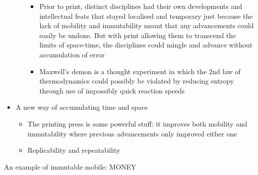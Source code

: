 \documentclass[a4paper]{article}
\begin{document}
\begin{itemize}
\begin{itemize}[label=$\circ$]
\begin{itemize}[label=\textsection]
			\item Prior to print, distinct disciplines had their own developments and intellectual feats that stayed localised and temporary just because the lack of mobility and immutability meant that any advancements could easily be undone. But with print allowing them to transcend the limits of space-time, the disciplines could mingle and advance without accumulation of error
			\item Maxwell’s demon is a thought experiment in which the 2nd law of thermodynamics could possibly be violated by reducing entropy through use of impossibly quick reaction speeds
		\end{itemize}
	\end{itemize}
	\item A new way of accumulating time and space
	\begin{itemize}[label=$\circ$]
		\item The printing press is some powerful stuff: it improves both mobility and immutability where previous advancements only improved either one
		\item Replicability and repeatability
	\end{itemize}
\end{itemize}
\noindent An example of immutable mobile: MONEY 
\end{document}

